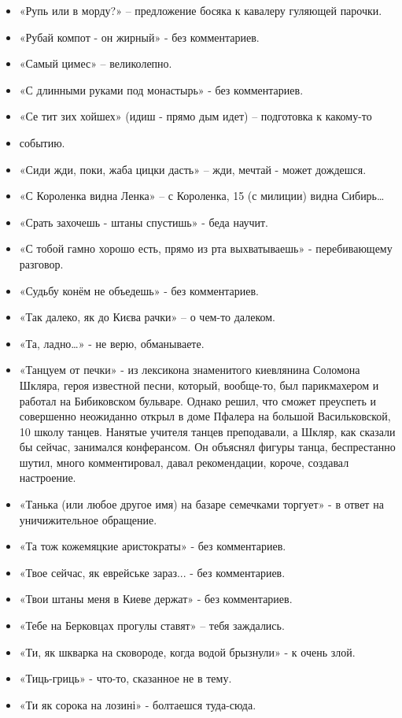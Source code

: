 \begin{itemize}
\item  «Рупь или в морду?» – предложение босяка к кавалеру гуляющей парочки.
\item  «Рубай компот - он жирный» - без комментариев.
\item  «Самый цимес» – великолепно.
\item  «С длинными руками под монастырь» - без комментариев.
\item  «Се тит зих хойшех» (идиш - прямо дым идет) – подготовка к какому-то 
\item  событию.
\item  «Сиди жди, поки, жаба цицки дасть» – жди, мечтай - может дождешся.
\item  «С Короленка видна Ленка» – с Короленка, 15 (с милиции) видна Сибирь…
\item  «Срать захочешь - штаны спустишь» - беда научит.
\item  «С тобой гамно хорошо есть, прямо из рта выхватываешь» - перебивающему разговор.
\item  «Судьбу конём не объедешь» - без комментариев.
\item  «Так далеко, як до Києва рачки» – о чем-то далеком.
\item  «Та, ладно…» - не верю, обманываете.
\item  «Танцуем от печки» - из лексикона знаменитого киевлянина Соломона Шкляра, героя известной песни, который, вообще-то, был парикмахером и работал на Бибиковском бульваре. Однако решил, что сможет преуспеть и совершенно неожиданно открыл в доме Пфалера на большой Васильковской, 10 школу танцев. Нанятые учителя танцев преподавали, а Шкляр, как сказали бы сейчас, занимался конферансом. Он объяснял фигуры танца, беспрестанно шутил, много комментировал, давал рекомендации, короче, создавал настроение. 
\item  «Танька (или любое другое имя) на базаре семечками торгует» - в ответ на уничижительное обращение.
\item  «Та тож кожемяцкие аристократы» - без комментариев.
\item  «Твое сейчас, як еврейське зараз... - без комментариев.
\item  «Твои штаны меня в Киеве держат» - без комментариев.
\item  «Тебе на Берковцах прогулы ставят» – тебя заждались.
\item  «Ти, як шкварка на сковороде, когда водой брызнули» - к очень злой.
\item  «Тиць-гриць» - что-то, сказанное не в тему.
\item  «Ти як сорока на лозині» - болтаешся туда-сюда.

\end{itemize}
